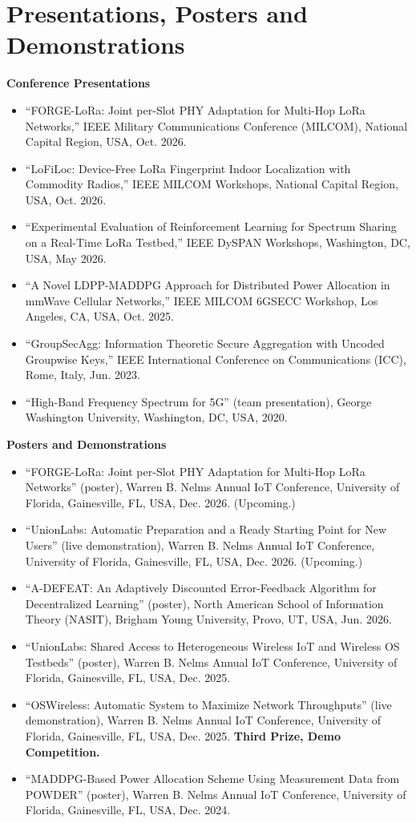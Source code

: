\documentclass[10pt]{article}
\begin{document}
\section*{Presentations, Posters and Demonstrations}
\textbf{Conference Presentations}
\begin{itemize}[leftmargin=2.4em,labelwidth=2em,align=left]
\item[{[T1]}] ``FORGE-LoRa: Joint per-Slot PHY Adaptation for Multi-Hop LoRa Networks,'' IEEE Military Communications Conference (MILCOM), National Capital Region, USA, Oct. 2026.
\item[{[T2]}] ``LoFiLoc: Device-Free LoRa Fingerprint Indoor Localization with Commodity Radios,'' IEEE MILCOM Workshops, National Capital Region, USA, Oct. 2026.
\item[{[T3]}] ``Experimental Evaluation of Reinforcement Learning for Spectrum Sharing on a Real-Time LoRa Testbed,'' IEEE DySPAN Workshops, Washington, DC, USA, May 2026.
\item[{[T4]}] ``A Novel LDPP-MADDPG Approach for Distributed Power Allocation in mmWave Cellular Networks,'' IEEE MILCOM 6GSECC Workshop, Los Angeles, CA, USA, Oct. 2025.
\item[{[T5]}] ``GroupSecAgg: Information Theoretic Secure Aggregation with Uncoded Groupwise Keys,'' IEEE International Conference on Communications (ICC), Rome, Italy, Jun. 2023.
\item[{[T6]}] ``High-Band Frequency Spectrum for 5G'' (team presentation), George Washington University, Washington, DC, USA, 2020.
\end{itemize}
\textbf{Posters and Demonstrations}
\begin{itemize}[leftmargin=2.4em,labelwidth=2em,align=left]
\item[{[P1]}] ``FORGE-LoRa: Joint per-Slot PHY Adaptation for Multi-Hop LoRa Networks'' (poster), Warren B. Nelms Annual IoT Conference, University of Florida, Gainesville, FL, USA, Dec. 2026. (Upcoming.)
\item[{[P2]}] ``UnionLabs: Automatic Preparation and a Ready Starting Point for New Users'' (live demonstration), Warren B. Nelms Annual IoT Conference, University of Florida, Gainesville, FL, USA, Dec. 2026. (Upcoming.)
\item[{[P3]}] ``A-DEFEAT: An Adaptively Discounted Error-Feedback Algorithm for Decentralized Learning'' (poster), North American School of Information Theory (NASIT), Brigham Young University, Provo, UT, USA, Jun. 2026.
\item[{[P4]}] ``UnionLabs: Shared Access to Heterogeneous Wireless IoT and Wireless OS Testbeds'' (poster), Warren B. Nelms Annual IoT Conference, University of Florida, Gainesville, FL, USA, Dec. 2025.
\item[{[P5]}] ``OSWireless: Automatic System to Maximize Network Throughputs'' (live demonstration), Warren B. Nelms Annual IoT Conference, University of Florida, Gainesville, FL, USA, Dec. 2025. \textbf{Third Prize, Demo Competition.}
\item[{[P6]}] ``MADDPG-Based Power Allocation Scheme Using Measurement Data from POWDER'' (poster), Warren B. Nelms Annual IoT Conference, University of Florida, Gainesville, FL, USA, Dec. 2024.
\end{itemize}
\end{document}
